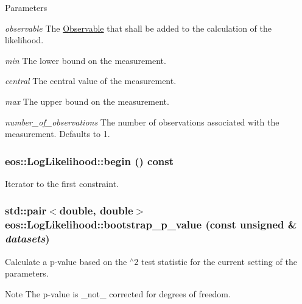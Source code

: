 \begin{DoxyParams}{Parameters}
\item[{\em observable}]The \hyperlink{classeos_1_1Observable}{Observable} that shall be added to the calculation of the likelihood. \item[{\em min}]The lower bound on the measurement. \item[{\em central}]The central value of the measurement. \item[{\em max}]The upper bound on the measurement. \item[{\em number\_\-of\_\-observations}]The number of observations associated with the measurement. Defaults to 1. \end{DoxyParams}
\hypertarget{classeos_1_1LogLikelihood_aa016da72e3b65c8a4ed58cebf1f50863}{
\subsubsection[{begin}]{ eos::LogLikelihood::begin () const}}
\label{classeos_1_1LogLikelihood_aa016da72e3b65c8a4ed58cebf1f50863}


Iterator to the first constraint. \hypertarget{classeos_1_1LogLikelihood_a51cd04019887511f540be75b4ef9ec7a}{
\subsubsection[{bootstrap\_\-p\_\-value}]{\setlength{\rightskip}{0pt plus 5cm}std::pair$<$double, double$>$ eos::LogLikelihood::bootstrap\_\-p\_\-value (const unsigned \& {\em datasets})}}
\label{classeos_1_1LogLikelihood_a51cd04019887511f540be75b4ef9ec7a}
Calculate a p-\/value based on the $^\wedge$2 test statistic for the current setting of the parameters. \begin{DoxyNote}{Note}
The p-\/value is \_\-not\_\- corrected for degrees of freedom. 
\end{DoxyNote}

